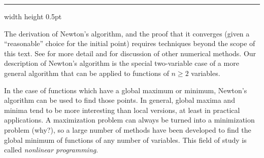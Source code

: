 \hrule width \textwidth height 0.5pt
\vspace{3mm}

The derivation of Newton's algorithm, and the proof that it converges (given a ``reasonable'' choice for the
initial point) requires techniques beyond the scope of this text. See \cite{rr} for more
detail and for discussion of other numerical methods. Our description of Newton's algorithm is the special
two-variable case of a more general algorithm that can be applied to functions of $n \ge 2$ variables.

In the case of functions which have a global maximum or minimum, 
Newton's algorithm can be used to find those points. 
In general, global maxima and minima tend to be more interesting than local versions, at least in practical applications. 
A maximization problem can always be turned into a minimization problem (why?), so a large number of methods have been developed to find the global minimum of functions of any number of variables. 
This field of study is called \emph{nonlinear programming}. 

